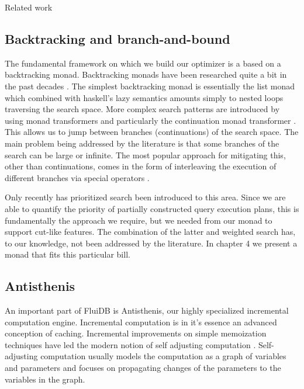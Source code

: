 \begin{corrected}{Related work}
\subsection{Backtracking and branch-and-bound}

The fundamental framework on which we build our optimizer is a based
on a backtracking monad. Backtracking monads have been researched
quite a bit in the past decades
\cite{kiselyovBacktrackingInterleavingTerminating,hinzeEfficientMonadicstyleBacktracking,hinzeDerivingBacktrackingMonad2000a,fischerReinventingHaskellBacktracking2009}. The
simplest backtracking monad is essentially the list monad which
combined with haskell's lazy semantics amounts simply to nested loops
traversing the search space. More complex search patterns are
introduced by using monad transformers
\cite{hedgesMonadTransformersBacktracking2014} and particularly the
continuation monad transformer
\cite{hinzeMonadicStyleBacktracking1996}. This allows us to jump
between branches (continuations) of the search space. The main problem
being addressed by the literature is that some branches of the search
can be large or infinite. The most popular approach for mitigating
this, other than continuations, comes in the form of interleaving the
execution of different branches via special operators
\cite{kiselyovBacktrackingInterleavingTerminating2005}.

Only recently \cite{kidneyAlgebrasWeightedSearch2021} has prioritized
search been introduced to this area. Since we are able to quantify the
priority of partially constructed query execution plans, this is
fundamentally the approach we require, but we needed from our monad to
support cut-like features. The combination of the latter and weighted
search has, to our knowledge, not been addressed by the literature. In
chapter 4 we present a monad that fits this particular bill.

\subsection{Antisthenis}

An important part of FluiDB is Antisthenis, our highly specialized
incremental computation engine. Incremental computation is in it's
essence an advanced conception of caching. Incremental improvements on
simple memoization techniques
\cite{pughIncrementalComputationFunction1989} have led the modern
notion of self adjusting computation
\cite{acarSelfadjustingComputation2005}. Self-adjusting computation
usually models the computation as a graph of variables and parameters
and focuses on propagating changes of the parameters to the variables
in the graph.


\end{corrected}
